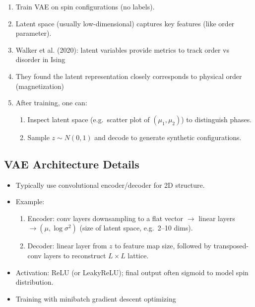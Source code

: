 \documentclass[%
oneside,                 %
final,                   %
10pt]{article}
\begin{document}
\begin{enumerate}
\item Train VAE on spin configurations (no labels).

\item Latent space (usually low-dimensional) captures key features (like order parameter).

\item Walker et al. (2020): latent variables provide metrics to track order vs disorder in Ising 

\item They found the latent representation closely corresponds to physical order (magnetization) 

\item After training, one can:
\begin{enumerate}

 \item Inspect latent space (e.g.\ scatter plot of $(\mu_1,\mu_2)$) to distinguish phases.

 \item Sample $z\sim N(0,1)$ and decode to generate synthetic configurations.
\end{enumerate}

\noindent
\end{enumerate}

\noindent
\subsection{VAE Architecture Details}

\begin{itemize}
\item Typically use convolutional encoder/decoder for 2D structure.

\item Example:
\begin{enumerate}

 \item Encoder: conv layers downsampling to a flat vector $\rightarrow$ linear layers $\rightarrow (\mu, \log\sigma^2)$ (size of latent space, e.g.\ 2–10 dims).

 \item Decoder: linear layer from $z$ to feature map size, followed by transposed-conv layers to reconstruct $L\times L$ lattice.

\end{enumerate}

\noindent
\item Activation: ReLU (or LeakyReLU); final output often sigmoid to model spin distribution.

\item Training with minibatch gradient descent optimizing
\end{itemize}
\end{document}
